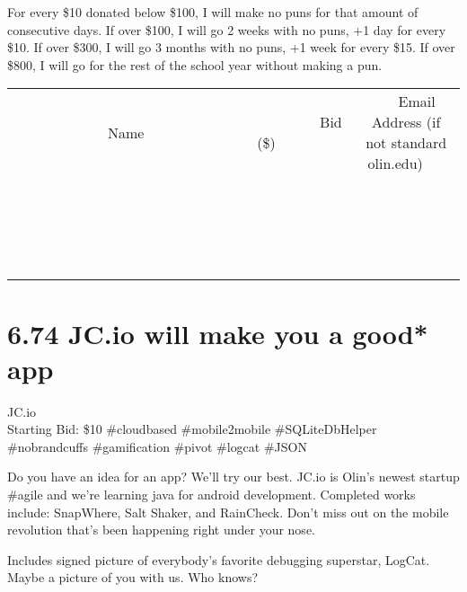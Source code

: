 \documentclass[11pt]{article}
\begin{document}
For every \$10 donated below \$100, I will make no puns for that amount of consecutive days.
If over \$100, I will go 2 weeks with no puns, +1 day for every \$10.
If over \$300, I will go 3 months with no puns, +1 week for every \$15. 
If over \$800, I will go for the rest of the school year without making a pun.
\\[3ex]
\begin{tabular}{c c c}
~~~~~~~~~~~~~Name~~~~~~~~~~~~~ & ~~~~~~~~~Bid (\$)~~~~~~~~~  & ~~~Email Address (if not standard olin.edu)~~~\\
 & & \\
\hline
 & & \\
\hline
 & & \\
\hline
 & & \\
\hline
 & & \\
\hline
 & & \\
\hline
 & & \\
\hline
 & & \\
\hline
 & & \\
\hline
 & & \\
\hline
 & & \\
\hline
 & & \\
\hline
 & & \\
\hline
 & & \\
\hline
 & & \\
\hline
 & & \\
\hline
 & & \\
\hline
 & & \\
\hline
 & & \\
\hline
\end{tabular}
\newpage
\section*{6.74 JC.io will make you a good* app}
JC.io
\\
Starting Bid: \$10
\newline
\#cloudbased \#mobile2mobile \#SQLiteDbHelper \#nobrandcuffs \#gamification \#pivot \#logcat \#JSON

Do you have an idea for an app?  We'll try our best.
JC.io is Olin's newest startup \#agile and we're learning java for android development.  Completed works include: SnapWhere, Salt Shaker, and RainCheck.  Don't miss out on the mobile revolution that's been happening right under your nose.

Includes signed picture of everybody's favorite debugging superstar, LogCat.  Maybe a picture of you with us. Who knows?
\end{document}
